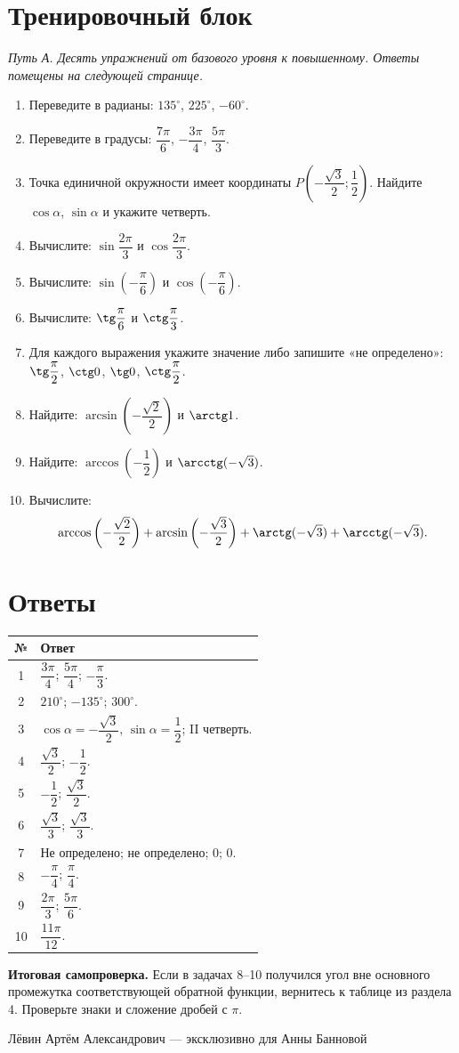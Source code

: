 \documentclass[a4paper,12pt]{article}
\newcommand{\sectionline}{\par\vspace{-2mm}{\color{accent}\rule{\linewidth}{0.35pt}}\par\vspace{2mm}}
\newcommand{\topic}[1]{\section*{\normalfont\color{darkaccent}#1}\sectionline}
\begin{document}
\clearpage
\topic{Тренировочный блок}
\textit{Путь А. Десять упражнений от базового уровня к повышенному. Ответы помещены на следующей странице.}
\begin{enumerate}[label=\textcolor{accent}{\bfseries\arabic*.},itemsep=8pt]
 \item Переведите в радианы: $135^\circ$, $225^\circ$, $-60^\circ$.
 \item Переведите в градусы: $\dfrac{7\pi}{6}$, $-\dfrac{3\pi}{4}$, $\dfrac{5\pi}{3}$.
 \item Точка единичной окружности имеет координаты $P\left(-\dfrac{\sqrt3}{2};\dfrac12\right)$. Найдите $\cos\alpha$, $\sin\alpha$ и укажите четверть.
 \item Вычислите: $\sin\dfrac{2\pi}{3}$ и $\cos\dfrac{2\pi}{3}$.
 \item Вычислите: $\sin\left(-\dfrac\pi6\right)$ и $\cos\left(-\dfrac\pi6\right)$.
 \item Вычислите: $\tg\dfrac\pi6$ и $\ctg\dfrac\pi3$.
 \item Для каждого выражения укажите значение либо запишите «не определено»: $\tg\dfrac\pi2$, $\ctg0$, $\tg0$, $\ctg\dfrac\pi2$.
 \item Найдите: $\arcsin\left(-\dfrac{\sqrt2}{2}\right)$ и $\arctg1$.
 \item Найдите: $\arccos\left(-\dfrac12\right)$ и $\arcctg(-\sqrt3)$.
 \item Вычислите:
 \[
 \arccos\left(-\frac{\sqrt2}{2}\right)
 +\arcsin\left(-\frac{\sqrt3}{2}\right)
 +\arctg(-\sqrt3)+\arcctg(-\sqrt3).
 \]
\end{enumerate}
\clearpage
\topic{Ответы}
\begingroup\renewcommand{\arraystretch}{1.5}
\begin{center}
\begin{tabularx}{\linewidth}{@{}c X@{}}
\toprule
№ & Ответ \\
\midrule
1 & $\dfrac{3\pi}{4}$; $\dfrac{5\pi}{4}$; $-\dfrac\pi3$. \\
2 & $210^\circ$; $-135^\circ$; $300^\circ$. \\
3 & $\cos\alpha=-\dfrac{\sqrt3}{2}$, $\sin\alpha=\dfrac12$; II четверть. \\
4 & $\dfrac{\sqrt3}{2}$; $-\dfrac12$. \\
5 & $-\dfrac12$; $\dfrac{\sqrt3}{2}$. \\
6 & $\dfrac{\sqrt3}{3}$; $\dfrac{\sqrt3}{3}$. \\
7 & Не определено; не определено; $0$; $0$. \\
8 & $-\dfrac\pi4$; $\dfrac\pi4$. \\
9 & $\dfrac{2\pi}{3}$; $\dfrac{5\pi}{6}$. \\
10 & $\dfrac{11\pi}{12}$. \\
\bottomrule
\end{tabularx}
\end{center}
\endgroup
\vspace{9mm}
\textbf{Итоговая самопроверка.} Если в задачах 8--10 получился угол вне основного промежутка соответствующей обратной функции, вернитесь к таблице из раздела 4. Проверьте знаки и сложение дробей с $\pi$.

\vfill
\begin{center}
{\small\color{textgray} Лёвин Артём Александрович --- эксклюзивно для Анны Банновой}
\end{center}
\end{document}
